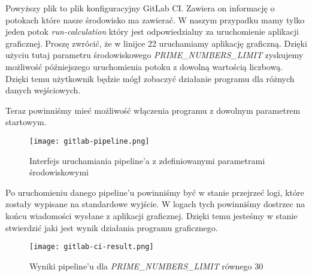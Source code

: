 Powyższy plik to plik konfiguracyjny GitLab CI. Zawiera on informację o potokach które nasze środowisko ma zawierać. W naszym przypadku mamy tylko jeden potok \textit{run-calculation} który jest odpowiedzialny za uruchomienie aplikacji graficznej. Proszę zwrócić, że w linijce 22 uruchamiamy aplikację graficzną. Dzięki użyciu tutaj parametru środowiskowego \textit{PRIME\_NUMBERS\_LIMIT} zyskujemy możliwość późniejszego uruchomienia potoku z dowolną wartością liczbową. Dzięki temu użytkownik będzie mógł zobaczyć działanie programu dla różnych danych wejściowych.
\par
Teraz powinniśmy mieć możliwość włączenia programu z dowolnym parametrem startowym.
\begin{figure}[htbp]
  \centering
  \texttt{[image: gitlab-pipeline.png]}
  \caption{Interfejs uruchamiania pipeline'a z zdefiniowanymi parametrami środowiskowymi}
  \label{fig:gitlab_pipeline}
\end{figure}
Po uruchomieniu danego pipeline'u powinniśmy być w stanie przejrzeć logi, które zostały wypisane na standardowe wyjście. W logach tych powinniśmy dostrzec na końcu wiadomości wysłane z aplikacji graficznej. Dzięki temu jesteśmy w stanie stwierdzić jaki jest wynik działania programu graficznego.
\begin{figure}[htbp]
  \centering
  \texttt{[image: gitlab-ci-result.png]}
  \caption{Wyniki pipeline'u dla \textit{PRIME\_NUMBERS\_LIMIT} równego 30}
  \label{fig:gitlab_pipeline_result}
\end{figure}

